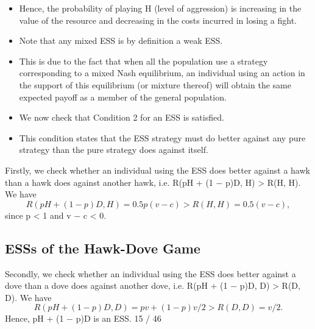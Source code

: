 \documentclass[]{report}
\begin{document}
\begin{itemize}
	\item 	Hence, the probability of playing H (level of aggression) is
	increasing in the value of the resource and decreasing in the costs
	incurred in losing a fight.
\item Note that any mixed ESS is by definition a weak ESS.
\item This is due to the fact that when all the population use a strategy
	corresponding to a mixed Nash equilibrium, an individual using an
	action in the support of this equilibrium (or mixture thereof) will
	obtain the same expected payoff as a member of the general
	population.
\end{itemize}

	
\begin{itemize}
	\item We now check that Condition 2 for an ESS is satisfied.
	\item This condition states that the ESS strategy must do better against
	any pure strategy than the pure strategy does against itself.
\end{itemize}
	
	Firstly, we check whether an individual using the ESS does better
	against a hawk than a hawk does against another hawk, i.e.
	R(pH + (1 − p)D, H) > R(H, H). We have
\[	R(pH + (1 − p)D, H) = 0.5p(v − c) > R(H, H) = 0.5(v − c),\]
	since p < 1 and v − c < 0.
	\subsection{ESSs of the Hawk-Dove Game}
	Secondly, we check whether an individual using the ESS does
	better against a dove than a dove does against another dove, i.e.
	R(pH + (1 − p)D, D) > R(D, D). We have
\[	R(pH + (1 − p)D, D) = pv + (1 − p)v/2 > R(D, D) = v/2.\]
	Hence, pH + (1 − p)D is an ESS.
	15 / 46
\end{document}
